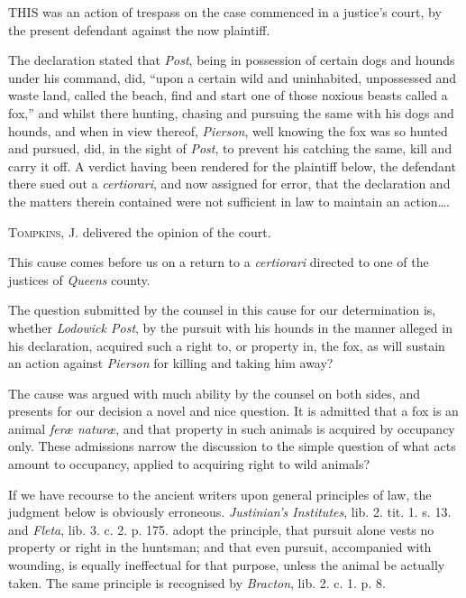 


THIS was an action of trespass on the case commenced in a justice's court, by
the present defendant against the now plaintiff.

The declaration stated that \textit{Post}, being in possession of certain dogs
and hounds under his command, did, ``upon a certain wild and uninhabited,
unpossessed and waste land, called the beach, find and start one of those
noxious beasts called a fox,'' and whilst there hunting, chasing and pursuing
the same with his dogs and hounds, and when in view thereof, \textit{Pierson},
well knowing the fox was so hunted and pursued, did, in the sight of
\textit{Post}, to prevent his catching the same, kill and carry it off. A
verdict having been rendered for the plaintiff below, the defendant there sued
out a \textit{certiorari}, and now assigned for error, that the declaration and
the matters therein contained were not sufficient in law to maintain an
action\ldots .

\opinion \textsc{Tompkins}, J. delivered the opinion of the court.

This cause comes before us on a return to a \textit{certiorari} directed to one
of the justices of \textit{Queens} county.

The question submitted by the counsel in this cause for our determination is,
whether \textit{Lodowick Post}, by the pursuit with his hounds in the manner
alleged in his declaration, acquired such a right to, or property in, the fox,
as will sustain an action against \textit{Pierson} for killing and taking him
away?

The cause was argued with much ability by the counsel on both sides, and
presents for our decision a novel and nice question. It is admitted that a fox
is an animal \textit{fer{\ae} natur{\ae}}, and that property in such animals is
acquired by occupancy only. These admissions narrow the discussion to the simple
question of what acts amount to occupancy, applied to acquiring right to wild
animals?

If we have recourse to the ancient writers upon general principles of law, the
judgment below is obviously erroneous. \textit{Justinian's Institutes}, lib. 2.
tit. 1. s. 13. and \textit{Fleta}, lib. 3. c. 2. p. 175. adopt the principle,
that pursuit alone vests no property or right in the huntsman; and that even
pursuit, accompanied with wounding, is equally ineffectual for that purpose,
unless the animal be actually taken. The same principle is recognised by
\textit{Bracton}, lib. 2. c. 1. p. 8.

